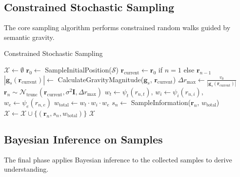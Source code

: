 \documentclass[12pt,a4paper]{article}
\begin{document}
\subsection{Constrained Stochastic Sampling}

The core sampling algorithm performs constrained random walks guided by semantic gravity.

\begin{algorithm}[H]
\caption{Constrained Stochastic Sampling}
\begin{algorithmic}[1]
    \State $\mathcal{X} \leftarrow \emptyset$ 
    \State $\mathbf{r}_0 \leftarrow$ SampleInitialPosition($\mathcal{S}$)
        \State $\mathbf{r}_{\text{current}} \leftarrow \mathbf{r}_0$ if $n = 1$ else $\mathbf{r}_{n-1}$
        \State $|\mathbf{g}_s(\mathbf{r}_{\text{current}})| \leftarrow$ CalculateGravityMagnitude($\mathbf{g}_s$, $\mathbf{r}_{\text{current}}$)
        \State $\Delta r_{\max} \leftarrow \frac{v_0}{|\mathbf{g}_s(\mathbf{r}_{\text{current}})|}$
        \State $\mathbf{r}_n \sim \mathcal{N}_{\text{trunc}}(\mathbf{r}_{\text{current}}, \sigma^2 \mathbf{I}, \Delta r_{\max})$
        \State $w_t \leftarrow \psi_t(r_{n,t})$, $w_i \leftarrow \psi_i(r_{n,i})$, $w_e \leftarrow \psi_e(r_{n,e})$
        \State $w_{\text{total}} \leftarrow w_t \cdot w_i \cdot w_e$
        \State $s_n \leftarrow$ SampleInformation($\mathbf{r}_n$, $w_{\text{total}}$)
        \State $\mathcal{X} \leftarrow \mathcal{X} \cup \{(\mathbf{r}_n, s_n, w_{\text{total}})\}$
    \EndFor
    \State \Return $\mathcal{X}$
\EndProcedure
\end{algorithmic}
\end{algorithm}

\subsection{Bayesian Inference on Samples}

The final phase applies Bayesian inference to the collected samples to derive understanding.
\end{document}
